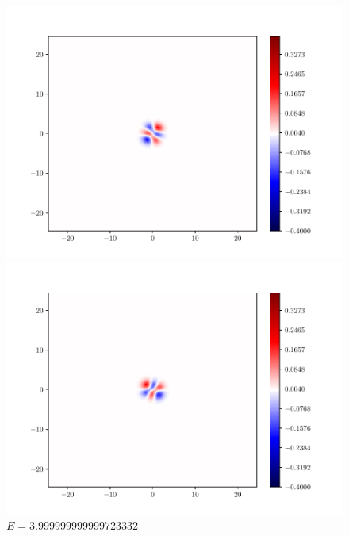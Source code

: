 \documentclass{article}
\begin{document}
\begin{enumerate}[1.]
\begin{enumerate}[(A)]
\begin{enumerate}[(i)]
\begin{figure}[H]
        \begin{minipage}{0.3\linewidth}
          \centering
          \includegraphics[width=\linewidth]{functions-6.pdf}
          \caption*{$E = 3.999999999999648281$}
        \end{minipage}
        \begin{minipage}{0.3\linewidth}
          \centering
          \includegraphics[width=\linewidth]{functions-7.pdf}
          \caption*{$E = 3.999999999999723332$}
        \end{minipage}
        \begin{minipage}{0.3\linewidth}
          \centering

\end{minipage}
\end{figure}
\end{enumerate}
\end{enumerate}
\end{enumerate}
\end{document}
